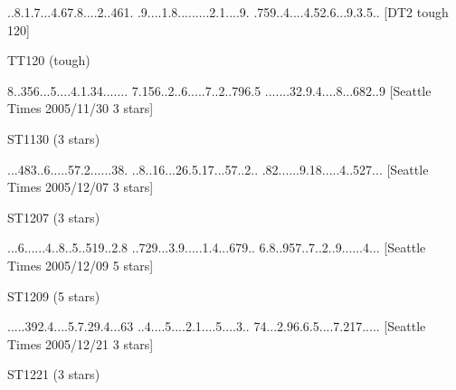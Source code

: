 \documentclass[twoside]{article}
\begin{document}
\renewcommand*{\puzzlefile}{tt120.sud}
\writepuzzle%
{..8.1.7..}{.4.67.8..}{..2..461.}%
{.9....1.8}{.........}{2.1....9.}%
{.759..4..}{..4.52.6.}{..9.3.5..}%
[DT2 tough 120]
\vfill
\begin{minipage}{0.95\linewidth}\begin{center}
TT120 (tough) \\
\end{center}\end{minipage}

\renewcommand*{\puzzlefile}{st1130.sud}
\writepuzzle%
{8..356...}{5....4.1.}{34.......}%
{7.156..2.}{.6.....7.}{.2..796.5}%
{.......32}{.9.4....8}{...682..9}%
[Seattle Times 2005/11/30 3 stars]
\vfill
\begin{minipage}{0.95\linewidth}\begin{center}
ST1130 (3 stars) \\
\end{center}\end{minipage}

\renewcommand*{\puzzlefile}{st1207.sud}
\writepuzzle%
{...483..6}{.....57.2}{......38.}%
{..8..16..}{.26.5.17.}{..57..2..}%
{.82......}{9.18.....}{4..527...}%
[Seattle Times 2005/12/07  3 stars]
\vfill
\begin{minipage}{0.95\linewidth}\begin{center}
ST1207 (3 stars) \\
\end{center}\end{minipage}

\renewcommand*{\puzzlefile}{st1209.sud}
\writepuzzle%
{...6.....}{.4..8..5.}{.519..2.8}%
{..729...3}{.9.....1.}{4...679..}%
{6.8..957.}{.7..2..9.}{.....4...}%
[Seattle Times 2005/12/09  5 stars]
\vfill
\begin{minipage}{0.95\linewidth}\begin{center}
ST1209 (5 stars) \\
\end{center}\end{minipage}

\renewcommand*{\puzzlefile}{st1221.sud}
\writepuzzle%
{.....392.}{4....5.7.}{29.4...63}%
{..4....5.}{...2.1...}{.5....3..}%
{74...2.96}{.6.5....7}{.217.....}%
[Seattle Times 2005/12/21 3 stars]
\vfill
\begin{minipage}{0.95\linewidth}\begin{center}
ST1221 (3 stars) \\
\end{center}\end{minipage}
\end{document}
